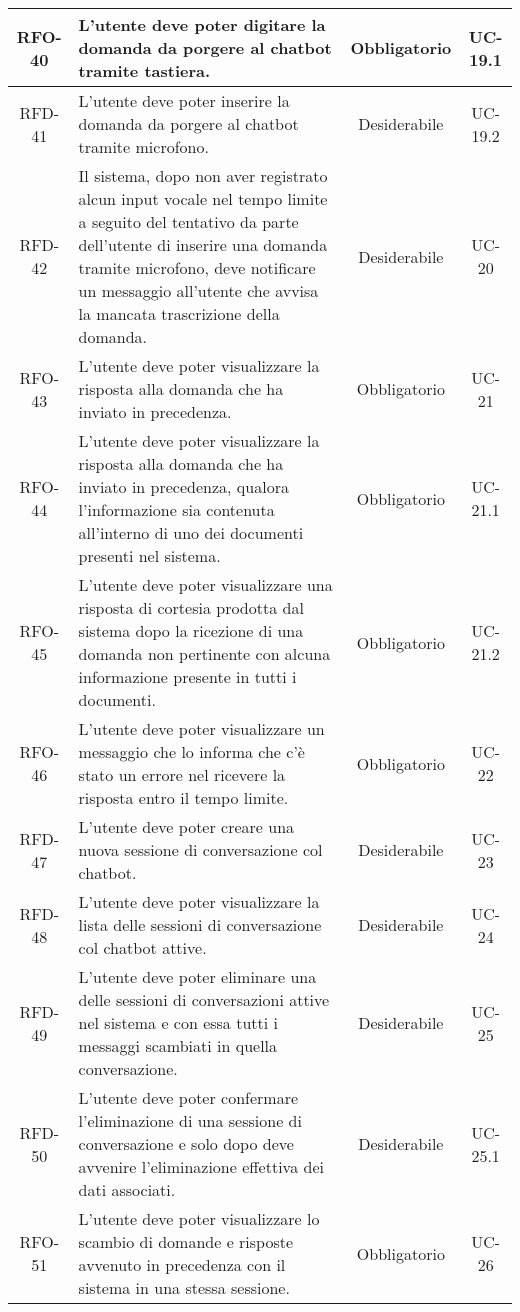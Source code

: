 \begin{xltabular}{\textwidth}{| c | X | c | c |}
    \hline
    RFO-40 & L’utente deve poter digitare la domanda da porgere al chatbot tramite tastiera. & Obbligatorio & UC-19.1 \\
    \hline
    RFD-41 & L’utente deve poter inserire la domanda da porgere al chatbot tramite microfono. & Desiderabile & UC-19.2 \\
    \hline
    RFD-42 & Il sistema, dopo non aver registrato alcun input vocale nel tempo limite a seguito del tentativo da parte dell'utente di inserire una domanda tramite microfono, deve notificare un messaggio all'utente che avvisa la mancata trascrizione della domanda. & Desiderabile & UC-20 \\
    \hline
    RFO-43 & L’utente deve poter visualizzare la risposta alla domanda che ha inviato in precedenza. & Obbligatorio & UC-21 \\
    \hline
    RFO-44 & L’utente deve poter visualizzare la risposta alla domanda che ha inviato in precedenza, qualora l'informazione sia contenuta all'interno di uno dei documenti presenti nel sistema. & Obbligatorio & UC-21.1 \\
    \hline
    RFO-45 & L’utente deve poter visualizzare una risposta di cortesia prodotta dal sistema dopo la ricezione di una domanda non pertinente con alcuna informazione presente in tutti i documenti. & Obbligatorio & UC-21.2 \\
    \hline
    RFO-46 & L'utente deve poter visualizzare un messaggio che lo informa che c'è stato un errore nel ricevere la risposta entro il tempo limite. & Obbligatorio & UC-22 \\
    \hline
    RFD-47 & L’utente deve poter creare una nuova sessione di conversazione col chatbot. & Desiderabile & UC-23 \\
    \hline
    RFD-48 & L’utente deve poter visualizzare la lista delle sessioni di conversazione col chatbot attive. & Desiderabile & UC-24 \\
    \hline
    RFD-49 & L’utente deve poter eliminare una delle sessioni di conversazioni attive nel sistema e con essa tutti i messaggi scambiati in quella conversazione. & Desiderabile & UC-25 \\
    \hline
    RFD-50 & L’utente deve poter confermare l’eliminazione di una sessione di conversazione e solo dopo deve avvenire l'eliminazione effettiva dei dati associati. & Desiderabile & UC-25.1 \\
    \hline
    RFO-51 & L’utente deve poter visualizzare lo scambio di domande e risposte avvenuto in precedenza con il sistema in una stessa sessione. & Obbligatorio & UC-26 \\

\end{xltabular}
